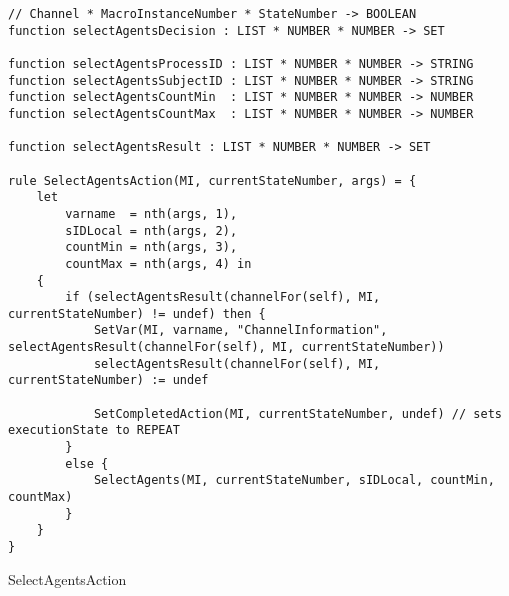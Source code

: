 \begin{listing}[H]
\begin{verbatim}
// Channel * MacroInstanceNumber * StateNumber -> BOOLEAN
function selectAgentsDecision : LIST * NUMBER * NUMBER -> SET

function selectAgentsProcessID : LIST * NUMBER * NUMBER -> STRING
function selectAgentsSubjectID : LIST * NUMBER * NUMBER -> STRING
function selectAgentsCountMin  : LIST * NUMBER * NUMBER -> NUMBER
function selectAgentsCountMax  : LIST * NUMBER * NUMBER -> NUMBER

function selectAgentsResult : LIST * NUMBER * NUMBER -> SET

rule SelectAgentsAction(MI, currentStateNumber, args) = {
    let
        varname  = nth(args, 1),
        sIDLocal = nth(args, 2),
        countMin = nth(args, 3),
        countMax = nth(args, 4) in
    {
        if (selectAgentsResult(channelFor(self), MI, currentStateNumber) != undef) then {
            SetVar(MI, varname, "ChannelInformation", selectAgentsResult(channelFor(self), MI, currentStateNumber))
            selectAgentsResult(channelFor(self), MI, currentStateNumber) := undef

            SetCompletedAction(MI, currentStateNumber, undef) // sets executionState to REPEAT
        }
        else {
            SelectAgents(MI, currentStateNumber, sIDLocal, countMin, countMax)
        }
    }
}
\end{verbatim}
\caption{SelectAgentsAction}
\label{lst:asm:SelectAgentsAction}
\end{listing}





